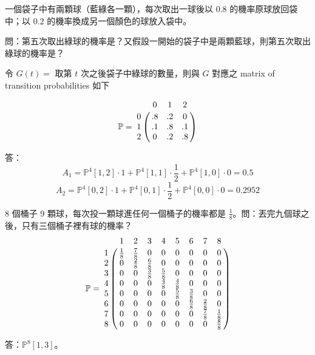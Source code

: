 \begin{example} 
一個袋子中有兩顆球（藍綠各一顆），每次取出一球後以 $ 0.8 $ 的機率原球放回袋中；以 $ 0.2 $ 的機率換成另一個顏色的球放入袋中。

問：第五次取出綠球的機率是？又假設一開始的袋子中是兩顆藍球，則第五次取出綠球的機率是？

令 $ G(t) = $ 取第 $ t $ 次之後袋子中綠球的數量，則與 $ G $ 對應之 matrix of transition probabilities 如下
\begin{multicols}{2}
\[ \mathbb{P} = \bordermatrix{
    &  0 & 1  &  2 \cr
  0 & .8 & .2 &  0 \cr
  1 & .1 & .8 & .1 \cr
  2 &  0 & .2 & .8 
} \]
\null \vfill
\null \vfill
{}
\end{multicols}

答：
\[A_1 = \mathbb{P}^4[1,2] \cdot 1 + \mathbb{P}^4[1,1] \cdot \frac{1}{2} + \mathbb{P}^4[1,0] \cdot 0 = 0.5\]
\[A_2 = \mathbb{P}^4[0,2] \cdot 1 + \mathbb{P}^4[0,1] \cdot \frac{1}{2} + \mathbb{P}^4[0,0] \cdot 0 = 0.2952\]
\end{example}

\begin{question} \label{q:balls}
8 個桶子 9 顆球，每次投一顆球進任何一個桶子的機率都是 $ \frac{1}{8} $。問：丟完九個球之後，只有三個桶子裡有球的機率？
\[ \mathbb{P} = \bordermatrix{
    & 1 & 2 & 3 & 4 & 5 & 6 & 7 & 8 \cr
  1 & \frac{1}{8} & \frac{7}{8} & 0 & 0 & 0 & 0 & 0 & 0 \cr
  2 & 0 & \frac{2}{8} & \frac{6}{8} & 0 & 0 & 0 & 0 & 0 \cr
  3 & 0 & 0 & \frac{3}{8} & \frac{5}{8} & 0 & 0 & 0 & 0 \cr
  4 & 0 & 0 & 0 & \frac{4}{8} & \frac{4}{8} & 0 & 0 & 0 \cr
  5 & 0 & 0 & 0 & 0 & \frac{5}{8} & \frac{3}{8} & 0 & 0 \cr
  6 & 0 & 0 & 0 & 0 & 0 & \frac{6}{8} & \frac{2}{8} & 0 \cr
  7 & 0 & 0 & 0 & 0 & 0 & 0 & \frac{7}{8} & \frac{1}{8} \cr
  8 & 0 & 0 & 0 & 0 & 0 & 0 & 0 & \frac{8}{8}
} \]
\begin{figure}[htp]
\centering
{}
\end{figure}

答：$ \mathbb{P}^{8} [1, 3] $。
\end{question}

